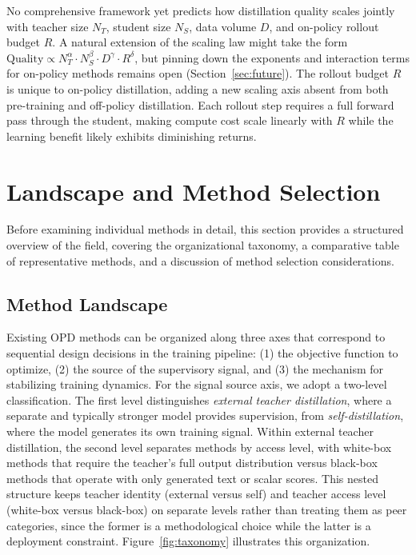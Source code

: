 \documentclass{article} %
\begin{document}
No comprehensive framework yet predicts how distillation quality scales jointly with teacher size $N_T$, student size $N_S$, data volume $D$, and on-policy rollout budget $R$. A natural extension of the \citet{2502.08606} scaling law might take the form $\text{Quality} \propto N_T^\alpha \cdot N_S^\beta \cdot D^\gamma \cdot R^\delta$, but pinning down the exponents and interaction terms for on-policy methods remains open (Section~\ref{sec:future}). The rollout budget $R$ is unique to on-policy distillation, adding a new scaling axis absent from both pre-training and off-policy distillation. Each rollout step requires a full forward pass through the student, making compute cost scale linearly with $R$ while the learning benefit likely exhibits diminishing returns.

\section{Landscape and Method Selection}
\label{sec:landscape}

Before examining individual methods in detail, this section provides a structured overview of the field, covering the organizational taxonomy, a comparative table of representative methods, and a discussion of method selection considerations.

\subsection{Method Landscape}

Existing OPD methods can be organized along three axes that correspond to sequential design decisions in the training pipeline: (1) the objective function to optimize, (2) the source of the supervisory signal, and (3) the mechanism for stabilizing training dynamics. For the signal source axis, we adopt a two-level classification. The first level distinguishes \emph{external teacher distillation}, where a separate and typically stronger model provides supervision, from \emph{self-distillation}, where the model generates its own training signal. Within external teacher distillation, the second level separates methods by access level, with white-box methods that require the teacher's full output distribution versus black-box methods that operate with only generated text or scalar scores. This nested structure keeps teacher identity (external versus self) and teacher access level (white-box versus black-box) on separate levels rather than treating them as peer categories, since the former is a methodological choice while the latter is a deployment constraint. Figure~\ref{fig:taxonomy} illustrates this organization.
\end{document}
